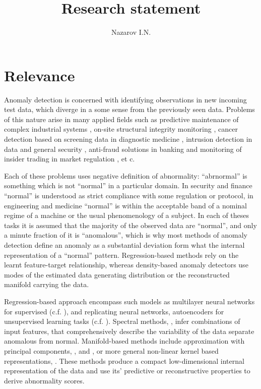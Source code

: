 \documentclass{extarticle}
\title{Research statement}
\author{Nazarov I.N.}
\begin{document}
\maketitle

\section{Relevance} %
\label{sec:relevance}

Anomaly detection is concerned with identifying observations in new incoming test
data, which diverge in a some sense from the previously seen data. Problems of this
nature arise in many applied fields such as predictive maintenance of complex industrial
systems \cite{tarassenko2009}, on-site structural integrity monitoring \cite{surace2010},
cancer detection based on screening data in diagnostic medicine \cite{tarassenko1995,quinn2007,clifton2011},
intrusion detection in data and general security \cite{jyothsna2011}, anti-fraud
solutions in banking and monitoring of insider trading in market regulation \cite{patcha2007},
et c.

Each of these problems uses negative definition of abnormality: ``abrnormal'' is
something which is not ``normal'' in a particular domain. In security and finance
``normal'' is understood as strict compliance with some regulation or protocol, in
engineering and medicine ``normal'' is within the acceptable band of a nominal regime
of a machine or the usual phenomenology of a subject. In each of theses tasks it is
assumed that the majority of the observed data are ``normal'', and only a minute
fraction of it is ``anomalous'', which is why most methods of anomaly detection
define an anomaly as a substantial deviation form what the internal representation
of a ``normal'' pattern. Regression-based methods rely on the learnt feature-target
relationship, whereas density-based anomaly detectors use modes of the estimated
data generating distribution or the reconstructed manifold carrying the data.

Regression-based approach encompass such models as multilayer neural networks for
supervised (c.f. \cite{augusteijn2002}), and replicating neural networks, autoencoders
for unsupervised learning tasks (c.f. \cite{hawkins2002,williams2002}). Spectral
methods, \cite{chandola2009}, infer combinations of input features, that comprehensively
describe the variability of the data separate anomalous from normal. Manifold-based
methods include approximation with principal components, \cite{dutta2007,shyu2003},
and \cite{jolliffe2014}, or more general non-linear kernel based representations,
\cite{hoffmann2007,scholkopf1998}. These methods produce a compact low-dimensional
internal representation of the data and use its' predictive or reconstructive properties
to derive abnormality scores.
\end{document}
